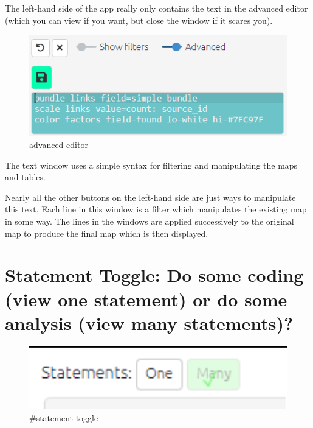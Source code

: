 \documentclass[
]{book}
\begin{document}
The left-hand side of the app really only contains the text in the advanced editor (which you can view if you want, but close the window if it scares you).

\begin{figure}
\centering
\includegraphics[width=6.77083in,height=\textheight]{_assets/image-20220808112708309.png}
\caption{advanced-editor}
\end{figure}

The text window uses a simple syntax for filtering and manipulating the maps and tables.

Nearly all the other buttons on the left-hand side are just ways to manipulate this text. Each line in this window is a filter which manipulates the existing map in some way. The lines in the windows are applied successively to the original map to produce the final map which is then displayed.

\hypertarget{statement-toggle-do-some-coding-view-one-statement-or-do-some-analysis-view-many-statements}{%
\section{Statement Toggle: Do some coding (view one statement) or do some analysis (view many statements)?}\label{statement-toggle-do-some-coding-view-one-statement-or-do-some-analysis-view-many-statements}}

\begin{figure}
\centering
\includegraphics[width=6.77083in,height=\textheight]{_assets/00600-tour0.png}
\caption{\#statement-toggle}
\end{figure}
\end{document}
